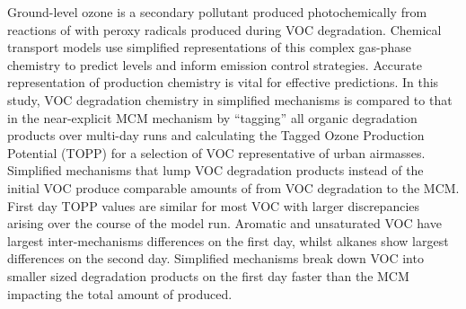 Ground-level ozone is a secondary pollutant produced photochemically from reactions of  with peroxy radicals produced during VOC degradation. 
Chemical transport models use simplified representations of this complex gas-phase chemistry to predict  levels and inform emission control strategies. 
Accurate representation of  production chemistry is vital for effective predictions.
In this study, VOC degradation chemistry in simplified mechanisms is compared to that in the near-explicit MCM mechanism by ``tagging'' all organic degradation products over multi-day runs and calculating the Tagged Ozone Production Potential (TOPP) for a selection of VOC representative of urban airmasses.
Simplified mechanisms that lump VOC degradation products instead of the initial VOC produce comparable amounts of  from VOC degradation to the MCM.
First day TOPP values are similar for most VOC with larger discrepancies arising over the course of the model run.
Aromatic and unsaturated VOC have largest inter-mechanisms differences on the first day, whilst alkanes show largest differences on the second day.
Simplified mechanisms break down VOC into smaller sized degradation products on the first day faster than the MCM impacting the total amount of  produced.
